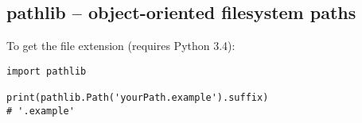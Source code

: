 \subsection{pathlib -- object-oriented filesystem paths}
To get the file extension (requires Python 3.4):
\begin{verbatim}
import pathlib

print(pathlib.Path('yourPath.example').suffix)
# '.example'
\end{verbatim}

%
